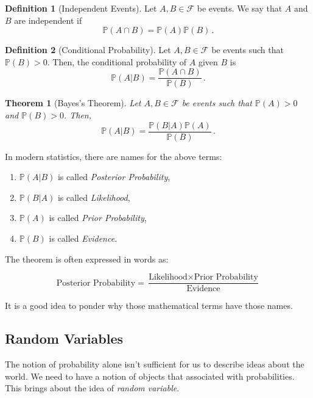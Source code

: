 \documentclass[
  openany]{book}
\newtheorem{theorem}{Theorem}[chapter]
\theoremstyle{definition}
\newtheorem{definition}{Definition}[chapter]
\theoremstyle{definition}
\theoremstyle{definition}
\theoremstyle{definition}
\theoremstyle{remark}
\begin{document}
\begin{definition}[Independent Events]
Let \(A, B \in \mathcal{F}\) be events. We say that \(A\) and \(B\) are independent
if
\[ \mathbb{P}(A \cap B) = \mathbb{P}(A) \mathbb{P}(B)  \,. \]
\end{definition}

\begin{definition}[Conditional Probability]
Let \(A, B \in \mathcal{F}\) be events such that \(\mathbb{P}(B) >0\). Then, the conditional probability of
\(A\) given \(B\) is
\[ \mathbb{P}(A \vert B) = \frac{\mathbb{P}(A \cap B)}{\mathbb{P}(B)} \,. \]
\end{definition}

\begin{theorem}[Bayes's Theorem]
Let \(A, B \in \mathcal{F}\) be events such that \(\mathbb{P}(A)>0\) and \(\mathbb{P}(B) >0\).
Then,
\[\mathbb{P}(A | B) = \frac{\mathbb{P}(B | A) \mathbb{P}(A)}{\mathbb{P}(B)} \,.\]
\end{theorem}

In modern statistics, there are names for the above terms:

\begin{enumerate}
\def\labelenumi{\arabic{enumi}.}
\item
  \(\mathbb{P}(A | B)\) is called \emph{Posterior Probability},
\item
  \(\mathbb{P}(B | A)\) is called \emph{Likelihood},
\item
  \(\mathbb{P}(A)\) is called \emph{Prior Probability},
\item
  \(\mathbb{P}(B)\) is called \emph{Evidence}.
\end{enumerate}

The theorem is often expressed in words as:

\[ \text{Posterior Probability} = \frac{\text{Likelihood} \times \text{Prior Probability}}{\text{Evidence}} \]

It is a good idea to ponder why those mathematical terms have those names.

\hypertarget{random-variables}{%
\subsection{Random Variables}\label{random-variables}}

The notion of probability alone isn't sufficient for us to describe ideas about the world.
We need to have a notion of objects that associated with probabilities.
This brings about the idea of \emph{random variable}.
\end{document}
